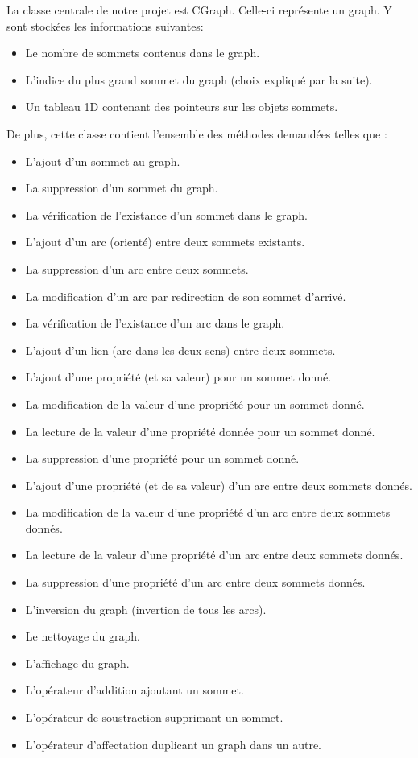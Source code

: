 		La classe centrale de notre projet est CGraph. Celle-ci représente un graph. Y sont stockées les informations suivantes:
		\begin{itemize}
			\item Le nombre de sommets contenus dans le graph.
			\item L'indice du plus grand sommet du graph (choix expliqué par la suite).
			\item Un tableau 1D contenant des pointeurs sur les objets sommets.\\
		\end{itemize}
		De plus, cette classe contient l'ensemble des méthodes demandées telles que :
		\begin{itemize}
			\item L'ajout d'un sommet au graph.
			\item La suppression d'un sommet du graph.
			\item La vérification de l'existance d'un sommet dans le graph.
			\item L'ajout d'un arc (orienté) entre deux sommets existants.
			\item La suppression d'un arc entre deux sommets.
			\item La modification d'un arc par redirection de son sommet d'arrivé.
			\item La vérification de l'existance d'un arc dans le graph.
			\item L'ajout d'un lien (arc dans les deux sens) entre deux sommets.
			\item L'ajout d'une propriété (et sa valeur) pour un sommet donné.
			\item La modification de la valeur d'une propriété pour un sommet donné.
			\item La lecture de la valeur d'une propriété donnée pour un sommet donné.
			\item La suppression d'une propriété pour un sommet donné.
			\item L'ajout d'une propriété (et de sa valeur) d'un arc entre deux sommets donnés.
			\item La modification de la valeur d'une propriété d'un arc entre deux sommets donnés.
			\item La lecture de la valeur d'une propriété d'un arc entre deux sommets donnés.
			\item La suppression d'une propriété d'un arc entre deux sommets donnés.
			\item L'inversion du graph (invertion de tous les arcs).
			\item Le nettoyage du graph.
			\item L'affichage du graph.
			\item L'opérateur d'addition ajoutant un sommet.
			\item L'opérateur de soustraction supprimant un sommet.
			\item L'opérateur d'affectation duplicant un graph dans un autre.\\
		\end{itemize}
		
